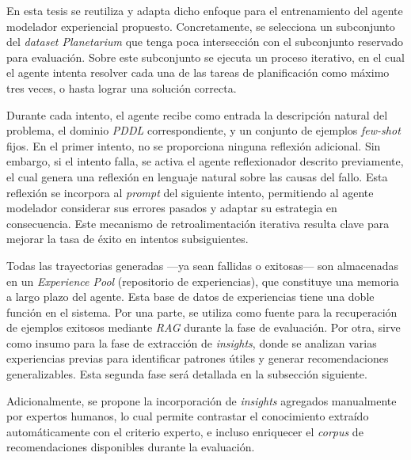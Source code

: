 En esta tesis se reutiliza y adapta dicho enfoque para el entrenamiento del agente modelador experiencial propuesto. Concretamente, se selecciona un subconjunto del \textit{dataset Planetarium} que tenga poca intersección con el subconjunto reservado para evaluación. Sobre este subconjunto se ejecuta un proceso iterativo, en el cual el agente intenta resolver cada una de las tareas de planificación como máximo tres veces, o hasta lograr una solución correcta.

Durante cada intento, el agente recibe como entrada la descripción natural del problema, el dominio \textit{PDDL} correspondiente, y un conjunto de ejemplos \textit{few-shot} fijos. En el primer intento, no se proporciona ninguna reflexión adicional. Sin embargo, si el intento falla, se activa el agente reflexionador descrito previamente, el cual genera una reflexión en lenguaje natural sobre las causas del fallo. Esta reflexión se incorpora al \textit{prompt} del siguiente intento, permitiendo al agente modelador considerar sus errores pasados y adaptar su estrategia en consecuencia. Este mecanismo de retroalimentación iterativa resulta clave para mejorar la tasa de éxito en intentos subsiguientes.

Todas las trayectorias generadas —ya sean fallidas o exitosas— son almacenadas en un \textit{Experience Pool} (repositorio de experiencias), que constituye una memoria a largo plazo del agente. Esta base de datos de experiencias tiene una doble función en el sistema. Por una parte, se utiliza como fuente para la recuperación de ejemplos exitosos mediante \textit{RAG} durante la fase de evaluación. Por otra, sirve como insumo para la fase de extracción de \textit{insights}, donde se analizan varias experiencias previas para identificar patrones útiles y generar recomendaciones generalizables. Esta segunda fase será detallada en la subsección siguiente.

Adicionalmente, se propone la incorporación de \textit{insights} agregados manualmente por expertos humanos, lo cual permite contrastar el conocimiento extraído automáticamente con el criterio experto, e incluso enriquecer el \textit{corpus} de recomendaciones disponibles durante la evaluación.

